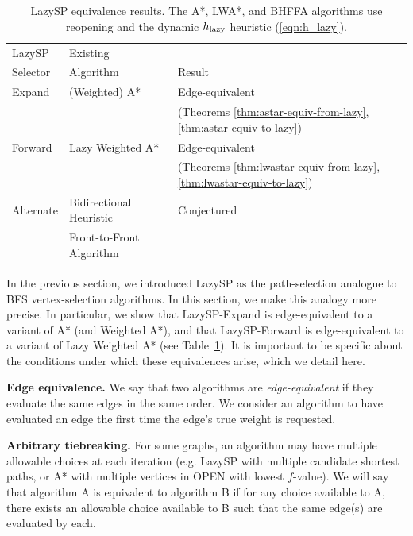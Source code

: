 \begin{table}
   \centering
   {\small%
   \begin{tabular}{lll}
      \toprule
      LazySP & Existing & \\
      Selector & Algorithm & Result \\
      \midrule
      Expand & (Weighted) A* & Edge-equivalent \\
      & & (Theorems \ref{thm:astar-equiv-from-lazy},
                 \ref{thm:astar-equiv-to-lazy}) \\
      \addlinespace[0.3em]
      Forward & Lazy Weighted A* & Edge-equivalent \\
      & & (Theorems \ref{thm:lwastar-equiv-from-lazy},
                 \ref{thm:lwastar-equiv-to-lazy}) \\
      \addlinespace[0.3em]
      Alternate & Bidirectional Heuristic & Conjectured \\
      & Front-to-Front Algorithm & \\
      \bottomrule
   \end{tabular}%
   }%
   \caption{LazySP equivalence results.
      The A*, LWA*, and BHFFA algorithms use reopening and the dynamic
      $h_{\mbox{\scriptsize lazy}}$ heuristic (\ref{eqn:h_lazy}).}
   \label{table:equivalences}
\end{table}

In the previous section,
we introduced LazySP as the path-selection analogue
to BFS vertex-selection algorithms.
In this section,
we make this analogy more precise.
In particular,
we show that LazySP-Expand
is edge-equivalent to a variant of A*
(and Weighted A*),
and that LazySP-Forward is edge-equivalent to a variant of
Lazy Weighted A*
(see Table~\ref{table:equivalences}).
It is important to be specific about the conditions under which
these equivalences arise,
which we detail here.

\textbf{Edge equivalence.}
We say that two algorithms are \emph{edge-equivalent} if they
evaluate the same edges in the same order.
We consider an algorithm to have evaluated an edge
the first time the edge's true weight is requested.

\textbf{Arbitrary tiebreaking.}
For some graphs,
an algorithm may have multiple allowable choices at each iteration
(e.g. LazySP with multiple candidate shortest paths,
or A* with multiple vertices in OPEN with lowest $f$-value).
We will say that algorithm A is equivalent to algorithm B
if for any choice available to A,
there exists an allowable choice available to B
such that the same edge(s) are evaluated by each.

